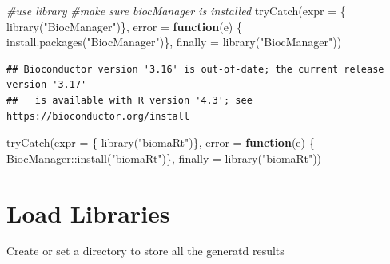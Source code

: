 \documentclass[
]{book}
\newenvironment{Shaded}{\begin{snugshade}}{\end{snugshade}}
\newcommand{\AttributeTok}[1]{\textcolor[rgb]{0.77,0.63,0.00}{#1}}
\newcommand{\CommentTok}[1]{\textcolor[rgb]{0.56,0.35,0.01}{\textit{#1}}}
\newcommand{\ControlFlowTok}[1]{\textcolor[rgb]{0.13,0.29,0.53}{\textbf{#1}}}
\newcommand{\FunctionTok}[1]{\textcolor[rgb]{0.00,0.00,0.00}{#1}}
\newcommand{\NormalTok}[1]{#1}
\newcommand{\SpecialCharTok}[1]{\textcolor[rgb]{0.00,0.00,0.00}{#1}}
\newcommand{\StringTok}[1]{\textcolor[rgb]{0.31,0.60,0.02}{#1}}
\begin{document}
\begin{Shaded}
\begin{Highlighting}[]
\CommentTok{\#use library}
\CommentTok{\#make sure biocManager is installed}
\FunctionTok{tryCatch}\NormalTok{(}\AttributeTok{expr =}\NormalTok{ \{ }\FunctionTok{library}\NormalTok{(}\StringTok{"BiocManager"}\NormalTok{)\}, }
         \AttributeTok{error =} \ControlFlowTok{function}\NormalTok{(e) \{ }
           \FunctionTok{install.packages}\NormalTok{(}\StringTok{"BiocManager"}\NormalTok{)\}, }
         \AttributeTok{finally =} \FunctionTok{library}\NormalTok{(}\StringTok{"BiocManager"}\NormalTok{))}
\end{Highlighting}
\end{Shaded}

\begin{verbatim}
## Bioconductor version '3.16' is out-of-date; the current release version '3.17'
##   is available with R version '4.3'; see https://bioconductor.org/install
\end{verbatim}

\begin{Shaded}
\begin{Highlighting}[]
\FunctionTok{tryCatch}\NormalTok{(}\AttributeTok{expr =}\NormalTok{ \{ }\FunctionTok{library}\NormalTok{(}\StringTok{"biomaRt"}\NormalTok{)\}, }
         \AttributeTok{error =} \ControlFlowTok{function}\NormalTok{(e) \{ }
\NormalTok{           BiocManager}\SpecialCharTok{::}\FunctionTok{install}\NormalTok{(}\StringTok{"biomaRt"}\NormalTok{)\}, }
         \AttributeTok{finally =} \FunctionTok{library}\NormalTok{(}\StringTok{"biomaRt"}\NormalTok{))}
\end{Highlighting}
\end{Shaded}

\hypertarget{load-libraries}{%
\section{Load Libraries}\label{load-libraries}}

Create or set a directory to store all the generatd results

\begin{Shaded}
\end{Shaded}
\end{document}
